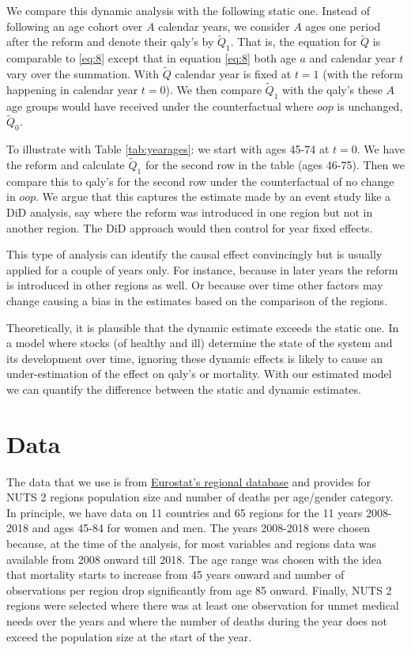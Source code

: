\documentclass[a4paper,12pt]{article}
\begin{document}
We compare this dynamic analysis with the following static one. Instead of following an age cohort over \(A\) calendar years, we consider \(A\) ages one period after the reform and denote their qaly's by \(\tilde Q_1\). That is, the equation for \(\tilde Q\) is comparable to \eqref{eq:8} except that in equation \eqref{eq:8} both age \(a\) and calendar year \(t\) vary over the summation. With \(\tilde Q\) calendar year is fixed at \(t=1\) (with the reform happening in calendar year \(t=0\)). We then compare \(\tilde Q_1\) with the qaly's these \(A\) age groups would have received under the counterfactual where \(oop\) is unchanged, \(\tilde Q_0\).

To illustrate with Table \ref{tab:yearages}: we start with ages 45-74 at \(t=0\). We have the reform and calculate \(\tilde Q_1\) for the second row in the table (ages 46-75). Then we compare this to qaly's for the second row under the counterfactual of no change in \(oop\). We argue that this captures the estimate made by an event study like a DiD analysis, say where the reform was introduced in one region but not in another region. The DiD approach would then control for year fixed effects.

This type of analysis can identify the causal effect convincingly but is usually applied for a couple of years only. For instance, because in later years the reform is introduced in other regions as well. Or because over time other factors may change causing a bias in the estimates based on the comparison of the regions.

Theoretically, it is plausible that the dynamic estimate exceeds the static one. In a model where stocks (of healthy and ill) determine the state of the system and its development over time, ignoring these dynamic effects is likely to cause an under-estimation of the effect on qaly's or mortality. With our estimated model we can quantify the difference between the static and dynamic estimates.
\section{Data}
\label{sec:org3ecbe5c}

The data that we use is from \href{https://ec.europa.eu/eurostat/web/regions/database}{Eurostat's regional database} and provides for NUTS 2 regions population size and number of deaths per age/gender category. In principle, we have data on 11 countries and 65 regions for the 11 years 2008-2018 and ages 45-84 for women and men. The years 2008-2018 were chosen  because, at the time of the analysis, for most variables and regions data was available from 2008 onward till 2018. The age range was chosen with the idea that mortality starts to increase from 45 years onward and number of observations per region drop significantly from age 85 onward. Finally, NUTS 2 regions were selected where there was at least one observation for unmet medical needs over the years and where the number of deaths during the year does not exceed the population size at the start of the year.
\end{document}
